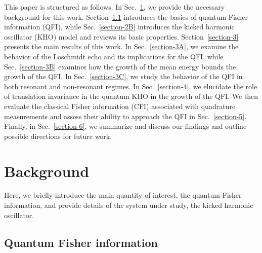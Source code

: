 \documentclass[amsmath,nobibnotes,aps,amssymb,pra, prl,aps,showpacs,superscriptaddress,twocolumn, longbibliography, reprint]{revtex4-2}
\begin{document}
This paper is structured as follows. In Sec.~\ref{section-2}, we provide the necessary background for this work. Section~\ref{section-2A} introduces the basics of quantum Fisher information (QFI), while Sec.~\ref{section-2B} introduces the kicked harmonic oscillator (KHO) model and reviews its basic properties. Section~\ref{section-3} presents the main results of this work. In Sec.~\ref{section-3A}, we examine the behavior of the Loschmidt echo and its implications for the QFI, while Sec.~\ref{section-3B} examines how the growth of the mean energy bounds the growth of the QFI. In Sec.~\ref{section-3C}, we study the behavior of the QFI in both resonant and non-resonant regimes. In Sec.~\ref{section-4}, we elucidate the role of translation invariance in the quantum KHO in the growth of the QFI. We then evaluate the classical Fisher information (CFI) associated with quadrature measurements and assess their ability to approach the QFI in Sec.~\ref{section-5}. Finally, in Sec.~\ref{section-6}, we summarize and discuss our findings and outline possible directions for future work.



\section{Background}
\label{section-2}

Here, we briefly introduce the main quantity of interest, the quantum Fisher information, and provide details of the system under study, the kicked harmonic oscillator.  

\subsection{Quantum Fisher information}
\label{section-2A}
\end{document}
